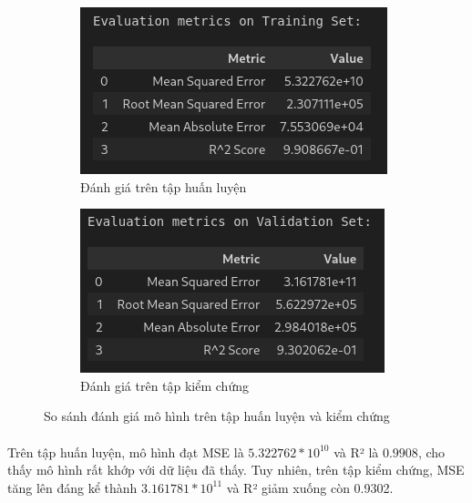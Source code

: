 \begin{figure}[H]
    \centering
    \begin{subfigure}[b]{0.48\textwidth}
        \centering
        \includegraphics[width=\linewidth]{img/simple-linear-train.png}
        \caption{Đánh giá trên tập huấn luyện}
        \label{fig:simple-linear-train}
    \end{subfigure}
    \hfill
    \begin{subfigure}[b]{0.48\textwidth}
        \centering
        \includegraphics[width=\linewidth]{img/simple-linear-valid.png}
        \caption{Đánh giá trên tập kiểm chứng}
        \label{fig:simple-linear-valid}
    \end{subfigure}
    \caption{So sánh đánh giá mô hình trên tập huấn luyện và kiểm chứng} 
    \label{fig:simple-linear-eval}
\end{figure}

\paragraph{}{Trên tập huấn luyện, mô hình đạt MSE là $5.322762 * 10^{10}$ và R² là $0.9908$, cho thấy mô hình rất khớp với dữ liệu đã thấy. Tuy nhiên, trên tập kiểm chứng, MSE tăng lên đáng kể thành $3.161781 * 10^{11}$ và R² giảm xuống còn 0.9302.}

